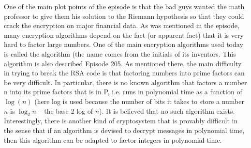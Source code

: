 
One of the main plot points of the episode is that the bad guys wanted the math professor to give them his solution to the Riemann hypothesis so that they could crack the encryption on major financial data. As was mentioned in the episode, many encryption algorithms depend on the fact (or apparent fact) that it is very hard to factor large numbers. One of the main encryption algorithms used today is called the  algorithm (the name comes from the initials of its inventors. This algorithm is also described \hyperref[205]{Episode 205}. As mentioned there, the main difficulty in trying to break the RSA code is that factoring numbers into prime factors can be very difficult. In particular, there is no known algorithm that factors a number n into its prime factors that is in P, i.e. runs in polynomial time as a function of $\log(n)$ (here log is used because the number of bits it takes to store a number $n$ is $\log_2 n$ -- the base 2 log of $n$). It is believed that no such algorithm exists. Interestingly, there is another kind of cryptosystem that is provably difficult in the sense that if an algorithm is devised to decrypt messages in polynomial time, then this algorithm can be adapted to factor integers in polynomial time.

